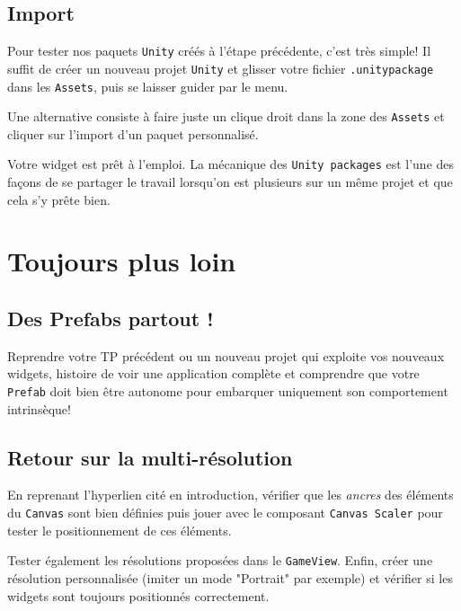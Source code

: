 \documentclass[a4paper,10pt]{article}
\newenvironment{info}%
{\begin{tcolorbox}[breakable,colback=green!5!white,colframe=green!75!black,title=Information]}%
{\end{tcolorbox}}
\begin{document}
\subsection{Import}

Pour tester nos paquets \texttt{Unity} créés à l'étape précédente, c'est très simple! Il suffit de créer un nouveau projet \texttt{Unity} et glisser votre fichier \texttt{.unitypackage} dans les \texttt{Assets}, puis se laisser guider par le menu.

\begin{info}
Une alternative consiste  à faire juste un clique droit dans la zone des \texttt{Assets} et cliquer sur l'import d'un paquet personnalisé.
\end{info}

Votre widget est prêt à l'emploi. La mécanique des \texttt{Unity packages} est l'une des façons de se partager le travail lorsqu'on est plusieurs sur un même projet et que cela s'y prête bien. 

\section{Toujours plus loin}

\subsection{Des Prefabs partout !}
Reprendre votre TP précédent ou un nouveau projet qui exploite vos nouveaux widgets, histoire de voir une application complète et comprendre que votre \texttt{Prefab} doit bien être autonome pour embarquer uniquement son comportement intrinsèque!

\subsection{Retour sur la multi-résolution}
En reprenant l'hyperlien cité en introduction, vérifier que les \textit{ancres} des éléments du \texttt{Canvas} sont bien définies puis jouer avec le composant \texttt{Canvas Scaler} pour tester le positionnement de ces éléments. 

Tester également les résolutions proposées dans le \texttt{GameView}. Enfin, créer une résolution personnalisée (imiter un mode "Portrait" par exemple) et vérifier si les widgets sont toujours positionnés correctement.
\end{document}
